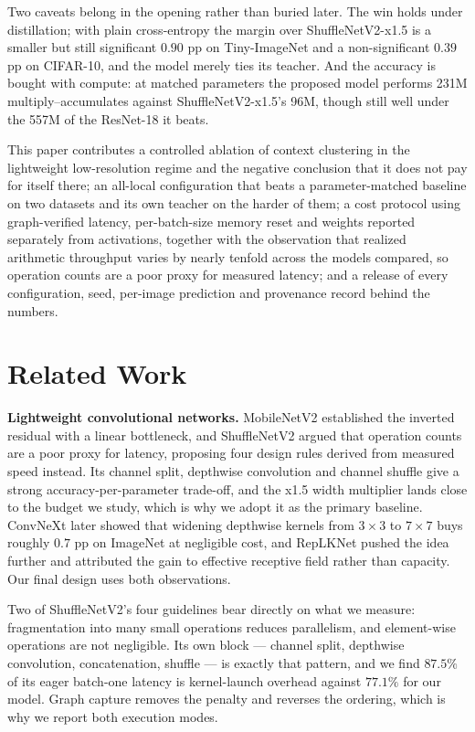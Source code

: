 Two caveats belong in the opening rather than buried later. The win holds
under distillation; with plain cross-entropy the margin over
ShuffleNetV2-x1.5 is a smaller but still significant $0.90$ pp on
Tiny-ImageNet and a non-significant $0.39$ pp on CIFAR-10, and the model
merely ties its teacher. And the accuracy is bought with compute: at
matched parameters the proposed model performs 231M multiply--accumulates
against ShuffleNetV2-x1.5's 96M, though still well under the 557M of the
ResNet-18 it beats.

This paper contributes a controlled ablation of context clustering in the
lightweight low-resolution regime and the negative conclusion that it does not
pay for itself there; an all-local configuration that beats a
parameter-matched baseline on two datasets and its own teacher on the harder
of them; a cost
protocol using graph-verified latency, per-batch-size memory reset and
weights reported separately from activations, together with the observation
that realized arithmetic throughput varies by nearly tenfold across the models
compared, so operation counts are a poor proxy for measured latency; and
a release of every configuration, seed, per-image prediction and provenance
record behind the numbers.

\section{Related Work}
\label{sec:related}

\textbf{Lightweight convolutional networks.} MobileNetV2 \cite{mobilenetv2}
established the inverted residual with a linear bottleneck, and ShuffleNetV2
\cite{shufflenetv2} argued that operation counts are a poor proxy for latency,
proposing four design rules derived from measured speed instead. Its channel
split, depthwise convolution and channel shuffle give a strong
accuracy-per-parameter trade-off, and the x1.5 width multiplier lands close to
the budget we study, which is why we adopt it as the primary baseline.
ConvNeXt \cite{convnext} later showed that widening depthwise kernels from
$3\times3$ to $7\times7$ buys roughly $0.7$ pp on ImageNet at negligible cost,
and RepLKNet \cite{replknet} pushed the idea further and attributed the gain
to effective receptive field rather than capacity. Our final design uses both
observations.

Two of ShuffleNetV2's four guidelines bear directly on what we measure:
fragmentation into many small operations reduces parallelism, and element-wise
operations are not negligible. Its own block --- channel split, depthwise
convolution, concatenation, shuffle --- is exactly that pattern, and we find
$87.5\%$ of its eager batch-one latency is kernel-launch overhead against
$77.1\%$ for our model. Graph capture removes the penalty and reverses the
ordering, which is why we report both execution modes.

